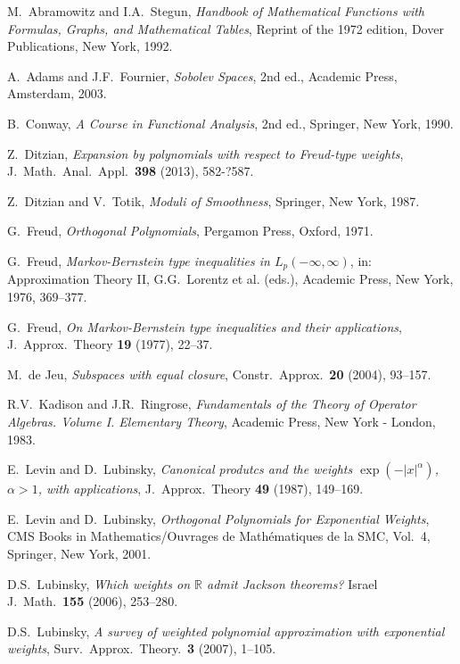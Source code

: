 \documentclass[12pt, reqno]{amsart}
\numberwithin{equation}{section}
\theoremstyle{plain}
\theoremstyle{definition}
\begin{document}

\begin{thebibliography}{99}

 M.~Abramowitz and I.A.~Stegun, \emph{Handbook of Mathematical Functions with Formulas, Graphs, and Mathematical Tables}, Reprint of the 1972 edition, Dover Publications, New York, 1992.

 A.~Adams and J.F.~Fournier, \emph{Sobolev Spaces}, 2nd  ed., Academic Press, Amsterdam, 2003.

 B.~Conway, \emph{A Course in Functional Analysis}, 2nd ed., Springer, New York, 1990.

 Z.~Ditzian, \emph{Expansion by polynomials with respect to Freud-type weights}, J.\ Math.\ Anal.\ Appl.\ {\bf 398} (2013), 582-?587.

 Z.~Ditzian and V.~Totik, \emph{Moduli of Smoothness}, Springer, New York, 1987.

 G.~Freud, \emph{Orthogonal Polynomials}, Pergamon Press, Oxford, 1971.

 G.~Freud, \emph{Markov-Bernstein type inequalities in $L_p(-\infty,\infty)$}, in: Approximation Theory II, G.G.~Lorentz et al. (eds.), Academic Press, New York, 1976, 369--377.

 G.~Freud, \emph{On Markov-Bernstein type inequalities and their applications}, J.\ Approx.\ Theory {\bf 19} (1977), 22--37.

 M.\ de Jeu, \emph{Subspaces with equal closure}, Constr.\ Approx.\ {\bf 20} (2004), 93--157.

 R.V.~Kadison and J.R.~Ringrose, \emph{Fundamentals of the Theory of Operator Algebras. Volume I. Elementary Theory}, Academic Press, New York - London, 1983.

 E.~Levin and D.~Lubinsky, \emph{Canonical produtcs and the weights $\exp\left(-|x|^\alpha\right)$, $\alpha > 1$, with applications}, J.\ Approx.\ Theory {\bf 49} (1987), 149--169.

 E.~Levin and D.~Lubinsky, \emph{Orthogonal Polynomials for Exponential Weights}, CMS Books in Mathematics/Ouvrages de Math\'{e}matiques de la SMC, Vol.~4, Springer, New York, 2001.

 D.S.~Lubinsky, \emph{Which weights on ${{\mathbb R}}$ admit Jackson theorems?} Israel J.\ Math.\  {\bf  155} (2006), 253--280.

 D.S.~Lubinsky, \emph{A survey of weighted polynomial approximation with exponential weights}, Surv.\ Approx.\ Theory.\  {\bf  3} (2007), 1--105.


\end{thebibliography}
\end{document}
